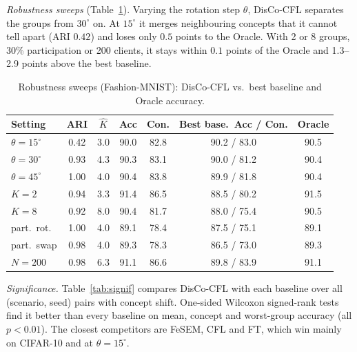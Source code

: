 \documentclass[journal]{IEEEtran}
\theoremstyle{definition}
\begin{document}
\emph{Robustness sweeps} (Table~\ref{tab:sweep}). Varying the rotation step $\theta$, DisCo-CFL separates the groups from $30^\circ$ on. At $15^\circ$ it merges neighbouring concepts that it cannot tell apart (ARI $0.42$) and loses only $0.5$ points to the Oracle. With 2 or 8 groups, 30\% participation or 200 clients, it stays within $0.1$ points of the Oracle and 1.3--2.9 points above the best baseline.

\begin{table}[t]
\centering
\caption{Robustness sweeps (Fashion-MNIST): DisCo-CFL vs.\ best baseline and Oracle accuracy.}\label{tab:sweep}
\scriptsize\setlength{\tabcolsep}{2.5pt}
\begin{tabular}{lcccccc}
\toprule
Setting & ARI & $\hat K$ & Acc & Con. & Best base.\ Acc / Con. & Oracle \\
\midrule
$\theta{=}15^\circ$ & 0.42 & 3.0 & 90.0 & 82.8 & 90.2 / 83.0 & 90.5 \\
$\theta{=}30^\circ$ & 0.93 & 4.3 & 90.3 & 83.1 & 90.0 / 81.2 & 90.4 \\
$\theta{=}45^\circ$ & 1.00 & 4.0 & 90.4 & 83.8 & 89.9 / 81.8 & 90.4 \\
$K{=}2$ & 0.94 & 3.3 & 91.4 & 86.5 & 88.5 / 80.2 & 91.5 \\
$K{=}8$ & 0.92 & 8.0 & 90.4 & 81.7 & 88.0 / 75.4 & 90.5 \\
part.\ rot. & 1.00 & 4.0 & 89.1 & 78.4 & 87.5 / 75.1 & 89.1 \\
part.\ swap & 0.98 & 4.0 & 89.3 & 78.3 & 86.5 / 73.0 & 89.3 \\
$N{=}200$ & 0.98 & 6.3 & 91.1 & 86.6 & 89.8 / 83.9 & 91.1 \\
\bottomrule
\end{tabular}
\end{table}

\emph{Significance.} Table~\ref{tab:signif} compares DisCo-CFL with each baseline over all (scenario, seed) pairs with concept shift. One-sided Wilcoxon signed-rank tests find it better than every baseline on mean, concept and worst-group accuracy (all $p<0.01$). The closest competitors are FeSEM, CFL and FT, which win mainly on CIFAR-10 and at $\theta=15^\circ$.
\end{document}
